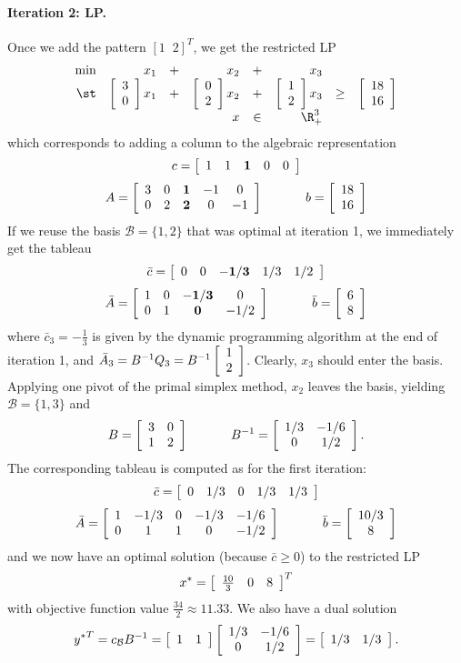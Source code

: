 \paragraph{Iteration 2: LP. }
Once we add the pattern $[ 1 \;\; 2 ]^T$, we get the restricted LP
\[
\begin{array}{rrcrcrcl}
\min & x_1 & + & x_2 & + & x_3 & & \\
\st  & \vvec{3 \\ 0} x_1 & + & \vvec{0 \\ 2} x_2 & + & \vvec{1 \\ 2} x_3 & \geq & \vvec{18 \\ 16} \\
     &                   &   &               x   & \in  & \R^3_+
\end{array}
\]
which corresponds to adding a column to the algebraic representation
\[
c = \vmat{ccccc}{1 & 1 & \mathbf{1} & 0 & 0}
\]
\[
A = \vmat{ccccc}{
	3 & 0 & \mathbf{1} & -1 & 0 \\
	0 & 2 & \mathbf{2} & 0 & -1 }
	\;\;\;\;\;\;\;\;\;\;\;\;
b = \vvec{18 \\ 16}
\]
If we reuse the basis $\mathcal{B} = \{ 1, 2 \}$
that was optimal at iteration 1, we immediately get the tableau
\[
\bar c = \vmat{ccccc}{0 & 0 & \mathbf{-1/3} & 1/3 & 1/2}
\]
\[
\bar A = \vmat{cccc}{
	1 & 0 & \mathbf{-1/3} & 0 \\
	0 & 1 & \mathbf{0} & -1/2 }
	\;\;\;\;\;\;\;\;\;\;\;\;
\bar b = \vvec{6 \\ 8}
\]
where $\bar c_3 = -\frac{1}{3}$ is given by the dynamic programming
algorithm at the end of iteration 1, and
$\bar A_3 = B^{-1} Q_3 = B^{-1} \vvec{1 \\ 2}$.
Clearly, $x_3$ should enter the basis.
Applying one pivot of the primal simplex method, $x_2$ leaves the
basis, yielding $\mathcal{B} = \{ 1, 3 \}$ and
\[
B = \vmat{cc}{3 & 0 \\ 1 & 2}
	\;\;\;\;\;\;\;\;\;\;\;\;
B^{-1} = \vmat{cc}{1/3 & -1/6 \\ 0 & 1/2}.
\]
The corresponding tableau is computed as for the first iteration:
\[
\bar c = \vmat{ccccc}{0 & 1/3 & 0 & 1/3 & 1/3}
\]
\[
\bar A = \vmat{ccccc}{
	1 & -1/3 & 0 & -1/3 & -1/6 \\
	0 & 1 & 1 & 0 & -1/2 }
	\;\;\;\;\;\;\;\;\;\;\;\;
\bar b = \vvec{10/3 \\ 8}
\]
and we now have an optimal solution (because $\bar c \geq 0$) to the
restricted LP
\[
x^* = \vmat{ccc}{\frac{10}{3} & 0 & 8}^T
\]
with objective function value $\frac{34}{2} \approx 11.33$.
We also have a dual solution
\[
{y^*}^T = c_{\mathcal{B}} B^{-1} = \vmat{cc}{ 1 & 1} \vmat{cc}{1/3 & -1/6 \\ 0 & 1/2}
 = \vmat{cc}{1/3 & 1/3}.
\]


